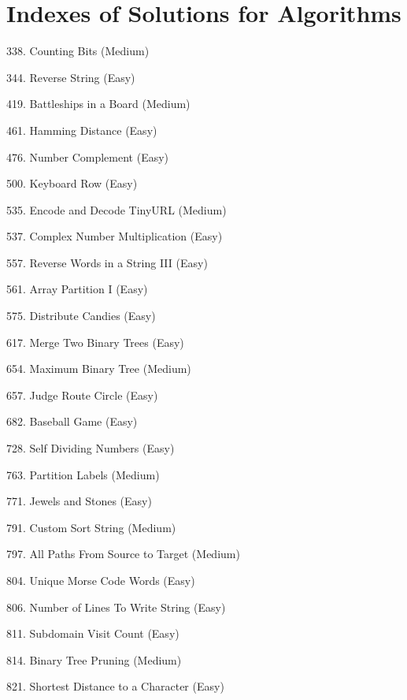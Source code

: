 \tocless\section{Indexes of Solutions for Algorithms}
\label{sec:algo_ind}

\begin{flushleft}
338. Counting Bits (Medium)\hfill\pageref{algo:338}

344. Reverse String (Easy)\hfill\pageref{algo:344}

419. Battleships in a Board (Medium)\hfill\pageref{algo:419}

461. Hamming Distance (Easy)\hfill\pageref{algo:461}

476. Number Complement (Easy)\hfill\pageref{algo:476}

500. Keyboard Row (Easy)\hfill\pageref{algo:500}

535. Encode and Decode TinyURL (Medium)\hfill\pageref{algo:535}

537. Complex Number Multiplication (Easy)\hfill\pageref{algo:537}

557. Reverse Words in a String III (Easy)\hfill\pageref{algo:557}

561. Array Partition I (Easy)\hfill\pageref{algo:561}

575. Distribute Candies (Easy)\hfill\pageref{algo:575}

617. Merge Two Binary Trees (Easy)\hfill\pageref{algo:617}

654. Maximum Binary Tree (Medium)\hfill\pageref{algo:654}

657. Judge Route Circle (Easy)\hfill\pageref{algo:657}

682. Baseball Game (Easy)\hfill\pageref{algo:682}

728. Self Dividing Numbers (Easy)\hfill\pageref{algo:728}

763. Partition Labels (Medium)\hfill\pageref{algo:763}

771. Jewels and Stones (Easy)\hfill\pageref{algo:771}

791. Custom Sort String (Medium)\hfill\pageref{algo:791}

797. All Paths From Source to Target (Medium)\hfill\pageref{algo:797}

804. Unique Morse Code Words (Easy)\hfill\pageref{algo:804}

806. Number of Lines To Write String (Easy)\hfill\pageref{algo:806}

811. Subdomain Visit Count (Easy)\hfill\pageref{algo:811}

814. Binary Tree Pruning (Medium)\hfill\pageref{algo:814}

821. Shortest Distance to a Character (Easy)\hfill\pageref{algo:821}
\end{flushleft}

\newpage
